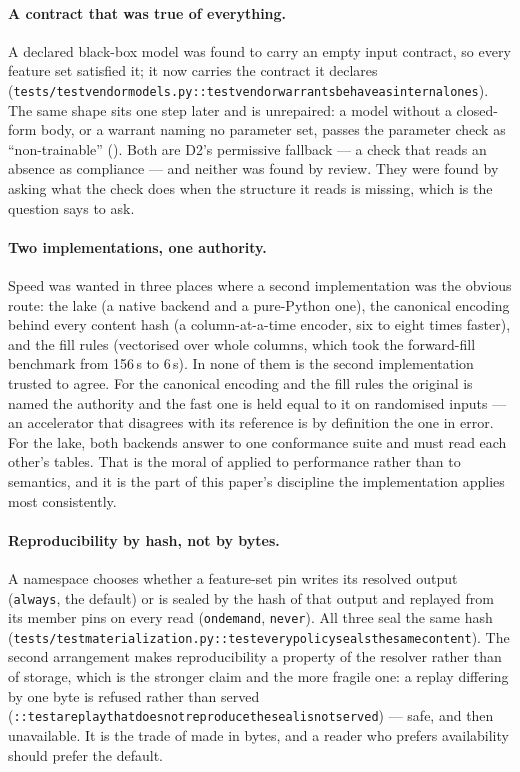 \documentclass[11pt,a4paper]{article}
\renewcommand{\_}{\oldunderscore\allowbreak}
\theoremstyle{plain}
\theoremstyle{definition}
\theoremstyle{definition}
\theoremstyle{remark}
\begin{document}
\paragraph{A contract that was true of everything.} A declared black-box model was found to carry an
empty input contract, so every feature set satisfied it; it now carries the contract it declares
(\texttt{tests/test\_vendor\_models.py::test\_vendor\_warrants\_behave\_as\_internal\_ones}). The same
shape sits one step later and is unrepaired: a model without a closed-form body, or a warrant naming no
parameter set, passes the parameter check as ``non-trainable'' (). Both are D2's
permissive fallback --- a check that reads an absence as compliance --- and neither was found by review.
They were found by asking what the check does when the structure it reads is missing, which is the
question  says to ask.

\paragraph{Two implementations, one authority.} Speed was wanted in three places where a second
implementation was the obvious route: the lake (a native backend and a pure-Python one), the canonical
encoding behind every content hash (a column-at-a-time encoder, six to eight times faster), and the fill
rules (vectorised over whole columns, which took the forward-fill benchmark from 156\,s to 6\,s). In none
of them is the second implementation trusted to agree. For the canonical encoding and the fill rules the
original is named the authority and the fast one is held equal to it on randomised inputs --- an
accelerator that disagrees with its reference is by definition the one in error. For the lake, both
backends answer to one conformance suite and must read each other's tables. That is the moral of
 applied to performance rather than to semantics, and it is the part of this paper's
discipline the implementation applies most consistently.

\paragraph{Reproducibility by hash, not by bytes.} A namespace chooses whether a feature-set pin writes
its resolved output (\texttt{always}, the default) or is sealed by the hash of that output and replayed
from its member pins on every read (\texttt{on\_demand}, \texttt{never}). All three seal the same hash
(\texttt{tests/test\_materialization.py::test\_every\_policy\_seals\_the\_same\_content}). The second
arrangement makes reproducibility a property of the resolver rather than of storage, which is the
stronger claim and the more fragile one: a replay differing by one byte is refused rather than served
(\texttt{::test\_a\_replay\_that\_does\_not\_reproduce\_the\_seal\_is\_not\_served}) --- safe, and then
unavailable. It is the trade of  made in bytes, and a reader who prefers availability
should prefer the default.
\end{document}
